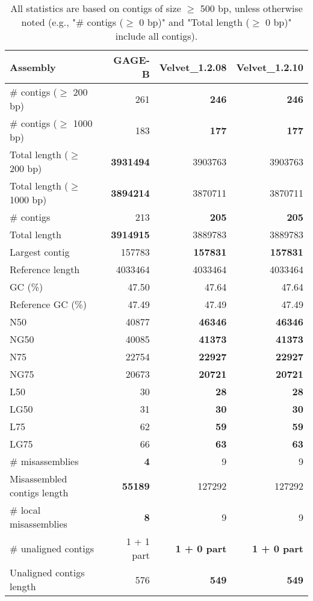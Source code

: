 \documentclass[12pt,a4paper]{article}
\begin{document}
\begin{table}[ht]
\begin{center}
\caption{All statistics are based on contigs of size $\geq$ 500 bp, unless otherwise noted (e.g., "\# contigs ($\geq$ 0 bp)" and "Total length ($\geq$ 0 bp)" include all contigs).}
\begin{tabular}{|l*{3}{|r}|}
\hline
Assembly & GAGE-B & Velvet\_1.2.08 & Velvet\_1.2.10 \\ \hline
\# contigs ($\geq$ 200 bp) & 261 & {\bf 246} & {\bf 246} \\ \hline
\# contigs ($\geq$ 1000 bp) & 183 & {\bf 177} & {\bf 177} \\ \hline
Total length ($\geq$ 200 bp) & {\bf 3931494} & 3903763 & 3903763 \\ \hline
Total length ($\geq$ 1000 bp) & {\bf 3894214} & 3870711 & 3870711 \\ \hline
\# contigs & 213 & {\bf 205} & {\bf 205} \\ \hline
Total length & {\bf 3914915} & 3889783 & 3889783 \\ \hline
Largest contig & 157783 & {\bf 157831} & {\bf 157831} \\ \hline
Reference length & 4033464 & 4033464 & 4033464 \\ \hline
GC (\%) & 47.50 & 47.64 & 47.64 \\ \hline
Reference GC (\%) & 47.49 & 47.49 & 47.49 \\ \hline
N50 & 40877 & {\bf 46346} & {\bf 46346} \\ \hline
NG50 & 40085 & {\bf 41373} & {\bf 41373} \\ \hline
N75 & 22754 & {\bf 22927} & {\bf 22927} \\ \hline
NG75 & 20673 & {\bf 20721} & {\bf 20721} \\ \hline
L50 & 30 & {\bf 28} & {\bf 28} \\ \hline
LG50 & 31 & {\bf 30} & {\bf 30} \\ \hline
L75 & 62 & {\bf 59} & {\bf 59} \\ \hline
LG75 & 66 & {\bf 63} & {\bf 63} \\ \hline
\# misassemblies & {\bf 4} & 9 & 9 \\ \hline
Misassembled contigs length & {\bf 55189} & 127292 & 127292 \\ \hline
\# local misassemblies & {\bf 8} & 9 & 9 \\ \hline
\# unaligned contigs & 1 + 1 part & {\bf 1 + 0 part} & {\bf 1 + 0 part} \\ \hline
Unaligned contigs length & 576 & {\bf 549} & {\bf 549} \\ \hline

\end{tabular}
\end{center}
\end{table}
\end{document}
